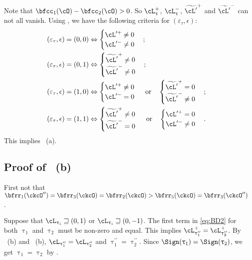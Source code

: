 \documentclass[12pt,a4paper]{amsart}
\def\pac#1{\ac_{#1}^+}
\def\nac#1{\ac_{#1}^-}
\def\ac{\cL}
\numberwithin{equation}{section}
\theoremstyle{remark}
\def\uptaupp{\uptau^{\prime\prime}}
\begin{document}
Note that $\bfcc_{1}(\cO)-\bfcc_{2}(\cO)>0$. So $\pac{\uptau}$, $\nac{\uptau}$,
$\tpac$ and $\tnac$ can not all vanish.
Using , we have the following criteria for
$(\varepsilon_{\tau},\epsilon)$:
\[
\begin{split}
  (\varepsilon_{\tau},\epsilon) = (0,0) & \Leftrightarrow
  \begin{cases} \opac \neq 0\\ \onac \neq 0 \end{cases};\\
  (\varepsilon_{\tau},\epsilon) = (0,1) & \Leftrightarrow
  \begin{cases} \tpac \neq 0\\ \tnac \neq 0 \end{cases};\\
  (\varepsilon_{\tau},\epsilon) = (1,0) & \Leftrightarrow
  \begin{cases} \opac \neq 0 \\ \onac  = 0 \end{cases} \text{ or} \quad
  \begin{cases} \tpac = 0 \\ \tnac  \neq 0 \end{cases}; \\
  (\varepsilon_{\tau},\epsilon) = (1,1) & \Leftrightarrow
  \begin{cases} \tpac \neq 0 \\ \tnac  = 0 \end{cases} \text{ or} \quad
  \begin{cases} \opac = 0 \\ \onac  \neq 0 \end{cases}.
\end{split}
\]
This implies ~(a).


\subsection*{\bf Proof of ~(b) }
First not that
$\bfrr_{1}(\ckcO'') = \bfrr_{3}(\ckcO)=\bfrr_{2}(\ckcO)>\bfrr_{5}(\ckcO) = \bfrr_{3}(\ckcO'')$.

Suppose that  $\ac_{\uptau_{i}} \sqsupseteq (0,1)$ or $\ac_{\uptau_{i}} \sqsupseteq (0,-1)$.
The first term in \eqref{eq:BD2} for both $\uptau_{1}$ and $\uptau_{2}$ must be
non-zero and equal.
This implies $\pac{\uptaupp_{1}}=\pac{\uptaupp_{2}}$.
By ~(b) and ~(b), $\ac_{\uptaupp_{1}} = \ac_{\uptaupp_{2}}$ and  $\uptaupp_{1}=\uptaupp_{2}$.
Since $\Sign(\uptau_{1})=\Sign(\uptau_{2})$, we get
$\uptau_{1}=\uptau_{2}$ by .
\end{document}
